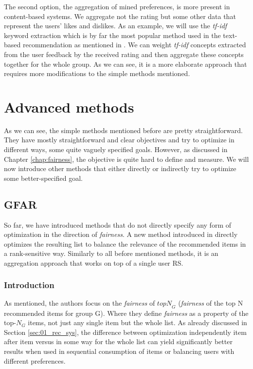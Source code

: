 The second option, the aggregation of mined preferences, is more present in content-based systems. We aggregate not the rating but some other data that represent the users' likes and dislikes. As an example, we will use the \textit{tf-idf} keyword extraction which is by far the most popular method used in the text-based recommendation as mentioned in \cite{beel_2016_rs_literature_survey}. We can weight \textit{tf-idf} concepts extracted from the user feedback by the received rating and then aggregate these concepts together for the whole group. As we can see, it is a more elaborate approach that requires more modifications to the simple methods mentioned.



\section{Advanced methods}\label{sec:03_advanced_methods}
As we can see, the simple methods mentioned before are pretty straightforward. They have mostly straightforward and clear objectives and try to optimize in different ways, some quite vaguely specified goals. However, as discussed in Chapter \ref{chap:fairness}, the objective is quite hard to define and measure. We will now introduce other methods that either directly or indirectly try to optimize some better-specified goal.

\subsection{GFAR} \label{subsec:03_advanced_methods.gfar}
So far, we have introduced methods that do not directly specify any form of optimization in the direction of \textit{fairness}. A new method introduced in\cite{GFAR-kaya2020} directly optimizes the resulting list to balance the relevance of the recommended items in a rank-sensitive way. Similarly to all before mentioned methods, it is an aggregation approach that works on top of a single user RS.

\subsubsection{Introduction}

As mentioned, the authors focus on the \textit{fairness} of $\mathit{topN}_G$ (\textit{fairness} of the top N recommended items for group G). Where they define \textit{fairness} as a property of the top-$N_G$ items, not just any single item but the whole list. As already discussed in Section \ref{sec:01_rec_sys}, the difference between optimization independently item after item versus in some way for the whole list can yield significantly better results when used in sequential consumption of items or balancing users with different preferences.

